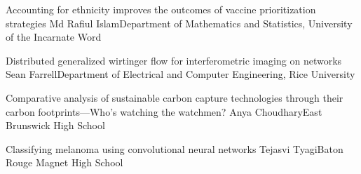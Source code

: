 \begin{postersPF}
\item\poster %
{Accounting for ethnicity improves the outcomes of  vaccine prioritization strategies}
{Md Rafiul Islam}{Department of Mathematics and Statistics, University of the Incarnate Word}

\item\poster %
{Distributed generalized wirtinger flow for interferometric imaging on networks}
{Sean Farrell}{Department of Electrical and Computer Engineering, Rice University}

\end{postersPF}


\begin{postersPH}

\item\poster %
{Comparative analysis of sustainable carbon capture technologies through their carbon footprints---Who's watching the watchmen?}
{Anya Choudhary}{East Brunswick High School}

\item\poster %
{Classifying melanoma using convolutional neural networks}
{Tejasvi Tyagi}{Baton Rouge Magnet High School}

\end{postersPH}



